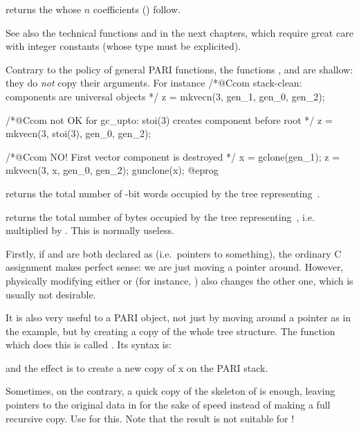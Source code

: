 returns the  whose $n$ coefficients () follow.

See also the technical functions  and  in the
next chapters, which require great care with integer constants (whose type
must be explicited).

 Contrary to the policy of general PARI functions, the
functions ,  and  are shallow: they do
\emph{not} copy their arguments. For instance
\bprog
  /*@Ccom stack-clean: components are universal objects */
  z = mkvecn(3, gen_1, gen_0, gen_2);

  /*@Ccom not OK for gc\_upto: stoi(3) creates component before root */
  z = mkvecn(3, stoi(3), gen_0, gen_2);

  /*@Ccom NO! First vector component  is destroyed */
  x = gclone(gen_1);
  z = mkvecn(3, x, gen_0, gen_2);
  gunclone(x);
@eprog


 returns the total number of \B-bit words occupied
by the tree representing~.

 returns the total number of bytes occupied
by the tree representing~, i.e.~ multiplied by
. This is normally useless.

Firstly, if  and  are both declared as  (i.e.~pointers
to something), the ordinary C assignment  makes perfect sense: we
are just moving a pointer around. However, physically modifying either
 or  (for instance, ) also changes the other
one, which is usually not desirable.

It is also very useful to  a PARI object, not just by moving around
a pointer as in the  example, but by creating a copy of the whole
tree structure. The function which does this is called . Its
syntax is:


\noindent and the effect is to create a new copy of x on the PARI stack.

Sometimes, on the contrary, a quick copy of the skeleton of  is
enough, leaving pointers to the original data in  for the sake of
speed instead of making a full recursive copy. Use
 for this. Note that the result is not suitable
for  !

